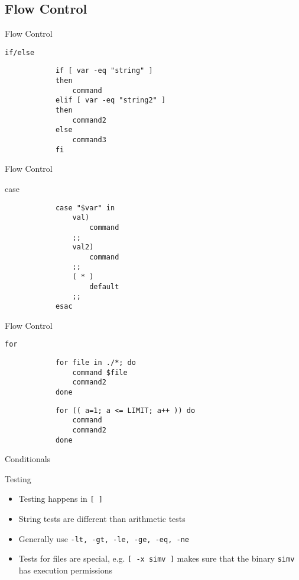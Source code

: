 \documentclass[table,dvipsnames]{beamer}
\begin{document}
\subsection{Flow Control}

\begin{frame}[fragile]{Flow Control}
	\begin{block}{\texttt{if/else}}
		\begin{verbatim}
			if [ var -eq "string" ]
			then
				command
			elif [ var -eq "string2" ] 
			then
				command2
			else
				command3
			fi
		\end{verbatim}
	\end{block}
\end{frame}

\begin{frame}[fragile]{Flow Control}
	\begin{block}{case}
		\begin{verbatim}
			case "$var" in
				val)
					command
				;;
				val2)
					command
				;;
				( * )
					default
				;;
			esac
		\end{verbatim}
	\end{block}
\end{frame}

\begin{frame}[fragile]{Flow Control}
	\begin{block}{\texttt{for}}
		\begin{verbatim}
			for file in ./*; do
				command $file
				command2
			done
		\end{verbatim}
		\begin{verbatim}
			for (( a=1; a <= LIMIT; a++ )) do
				command 
				command2
			done
		\end{verbatim}
	\end{block}
\end{frame}

\begin{frame}{Conditionals}
	\begin{block}{Testing}
		\begin{itemize}
			\item Testing happens in \texttt{[ ]}
			\item String tests are different than arithmetic tests
			\item Generally use \texttt{-lt, -gt, -le, -ge, -eq, -ne}
			\item Tests for files are special, e.g. \texttt{[ -x simv ]} makes
				sure that the binary \texttt{simv} has execution permissions
		\end{itemize}
	\end{block}
\end{frame}
\end{document}
